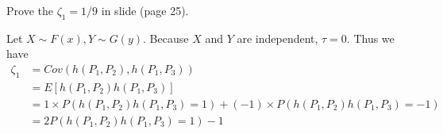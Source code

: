 \begin{problem}
    Prove the $\zeta_1=1/9$ in slide (page 25).
\end{problem}

\begin{solution}
    Let $X\sim F(x), Y\sim G(y)$. Because $X$ and $Y$ are independent, $\tau = 0$. 
    Thus we have
    \begin{equation*}
        \begin{split}
            \zeta_1 & = Cov (h(P_1, P_2), h(P_1, P_3)) \\
            & = E[h(P_1, P_2) h(P_1, P_3)] \\
            & = 1\times P(h(P_1, P_2) h(P_1, P_3)=1) + (-1) \times P(h(P_1, P_2) h(P_1, P_3)=-1) \\
            & = 2P(h(P_1, P_2) h(P_1, P_3)=1)-1
        \end{split}
    \end{equation*}


\end{solution}
